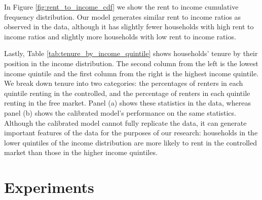\documentclass[parskip=full]{article}
\begin{document}
In Figure \ref{fig:rent_to_income_cdf} we show the rent to income cumulative frequency distribution. Our model generates similar rent to income ratios as observed in the data, although it has slightly fewer households with high rent to income ratios and slightly more households with low rent to income ratios. 

Lastly, Table \ref{tab:tenure_by_income_quintile} shows households' tenure by their position in the income distribution. The second column from the left is the lowest income quintile and the first column from the right is the highest income quintile. We break down tenure into two categories: the percentages of renters in each quintile renting in the controlled, and the percentage of renters in each quintile renting in the free market. Panel (a) shows these statistics in the data, whereas panel (b) shows the calibrated model's performance on the same statistics. Although the calibrated model cannot fully replicate the data, it can generate important features of the data for the purposes of our research: households in the lower quintiles of the income distribution are more likely to rent in the controlled market than those in the higher income quintiles.

\section{Experiments}\label{section:experiments}
\end{document}
